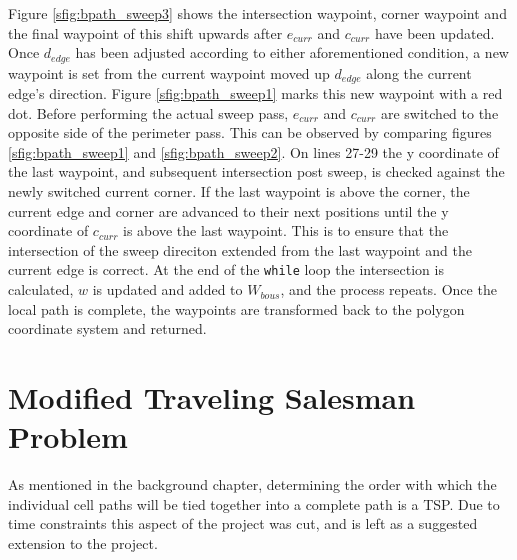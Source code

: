 Figure \ref{sfig:bpath_sweep3} shows the intersection waypoint, corner waypoint and the final waypoint of this shift upwards after $e_{curr}$ and $c_{curr}$ have been updated.
Once $d_{edge}$ has been adjusted according to either aforementioned condition, a new waypoint is set from the current waypoint moved up $d_{edge}$ along the current edge's direction.
Figure \ref{sfig:bpath_sweep1} marks this new waypoint with a red dot.
Before performing the actual sweep pass, $e_{curr}$ and $c_{curr}$ are switched to the opposite side of the perimeter pass.
This can be observed by comparing figures \ref{sfig:bpath_sweep1} and \ref{sfig:bpath_sweep2}.
On lines 27-29 the y coordinate of the last waypoint, and subsequent intersection post sweep, is checked against the newly switched current corner.
If the last waypoint is above the corner, the current edge and corner are advanced to their next positions until the y coordinate of $c_{curr}$ is above the last waypoint.
This is to ensure that the intersection of the sweep direciton extended from the last waypoint and the current edge is correct.
At the end of the \verb|while| loop the intersection is calculated, $w$ is updated and added to $W_{bous}$, and the process repeats.
Once the local path is complete, the waypoints are transformed back to the polygon coordinate system and returned.

\section{Modified Traveling Salesman Problem}
As mentioned in the background chapter, determining the order with which the individual cell paths will be tied together into a complete path is a TSP.
Due to time constraints this aspect of the project was cut, and is left as a suggested extension to the project.

